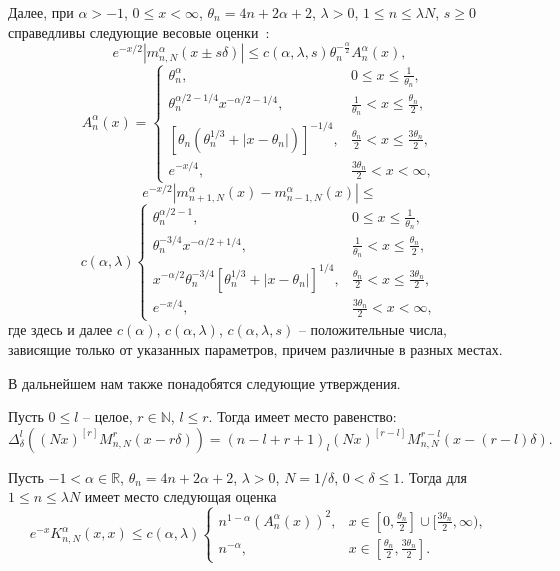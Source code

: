 Далее, при $\alpha>-1$, $0\le x<\infty$, $\theta_n=4n+2\alpha+2$, $\lambda>0$, $1\le n\le \lambda N$, $s\geq0$ справедливы следующие весовые оценки~\cite{Ram-SharBook}:
\begin{equation*}
e^{-x/2}\left|m_{n,N}^\alpha(x\pm s\delta)\right|\le c(\alpha,\lambda,s)\theta_n^{-\frac{\alpha}{2}}A_n^\alpha(x),
\end{equation*}
\begin{equation*}
A_n^\alpha(x)=\begin{cases}
\theta_n^{\alpha},&  0\le x\le \frac{1}{\theta_n},\\
\theta_n^{\alpha/2-1/4}x^{-\alpha/2-1/4},&     \frac{1}{\theta_n}<x\le {\frac{\theta_n}{2}},\\
\left[\theta_n(\theta_n^{1/3}+|x-\theta_n|)\right]^{-1/4},& {\frac{\theta_n}{2}}<x\leq{\frac{3\theta_n}{2}},\\
e^{-x/4}, & {\frac{3\theta_n}{2}}<x<\infty,
\end{cases}
\end{equation*}
$$
e^{-x/2}\left|m_{n+1,N}^{\alpha}(x)-m_{n-1,N}^{\alpha}(x)\right|\leq
$$
\begin{equation*}
c(\alpha,\lambda)\begin{cases}
\theta_n^{\alpha/2-1},&  0\le x\le \frac{1}{\theta_n},\\
\theta_n^{-3/4}x^{-\alpha/2+1/4},&     \frac{1}{\theta_n}<x\le {\frac{\theta_n}{2}},\\
x^{-\alpha/2}\theta_n^{-3/4}\left[\theta_n^{1/3}+|x-\theta_n|\right]^{1/4},& {\frac{\theta_n}{2}}<x\leq{\frac{3\theta_n}{2}},\\
e^{-x/4}, & {\frac{3\theta_n}{2}}<x<\infty,
\end{cases}
\end{equation*}
где здесь и далее $c(\alpha)$, $c(\alpha, \lambda)$, $c(\alpha, \lambda, s)$ -- положительные числа, зависящие только от указанных параметров, причем различные в разных местах.

В дальнейшем нам также понадобятся следующие утверждения.
\begin{lemma}
Пусть $0\le l$ -- целое, $r\in\mathbb{N}$, $l\le r$. Тогда имеет место равенство:
\begin{equation*}
\Delta^l_\delta\left((Nx)^{[r]}M^r_{n,N}(x-r\delta)\right)=(n-l+r+1)_l(Nx)^{[r-l]}M^{r-l}_{n,N}(x-(r-l)\delta).
\end{equation*}
\end{lemma}

\begin{lemma}
Пусть $-1<\alpha\in\mathbb{R}$, $\theta_n=4n+2\alpha+2$, $\lambda>0$, $N=1/\delta$, $0<\delta\leq1$. Тогда для $1\leq n\leq \lambda N$ имеет место следующая оценка
\begin{equation*}
e^{-x}K_{n,N}^\alpha(x,x)\le c(\alpha,\lambda)
\begin{cases}
n^{1-\alpha}(A_n^\alpha(x))^2, & x\in[0,\frac{\theta_n}{2}]\cup[\frac{3\theta_n}{2},\infty), \\
n^{-\alpha}, & x\in[\frac{\theta_n}{2},\frac{3\theta_n}{2}].
\end{cases}
\end{equation*}
\end{lemma}

